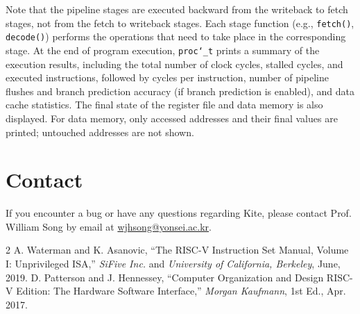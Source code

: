 \documentclass[10pt]{article}
\begin{document}
\begin{itemize}
    Note that the pipeline stages are executed backward from the writeback to fetch stages, not from the fetch to writeback stages.
    Each stage function (e.g., {\tt\small fetch()}, {\tt\small decode()}) performs the operations that need to take place in the corresponding stage.
    At the end of program execution, {\tt\small proc\char`_t} prints a summary of the execution results, including the total number of clock cycles, stalled cycles, and executed instructions, followed by cycles per instruction, number of pipeline flushes and branch prediction accuracy (if branch prediction is enabled), and data cache statistics.
    The final state of the register file and data memory is also displayed.
    For data memory, only accessed addresses and their final values are printed; untouched addresses are not shown.
\end{itemize}


\section{Contact} \label{sec:contact}
If you encounter a bug or have any questions regarding Kite, please contact Prof. William Song by email at \href{mailto:wjhsong@yonsei.ac.kr}{wjhsong@yonsei.ac.kr}.


\begin{thebibliography}{2}
    A. Waterman and K. Asanovic, 
    ``The RISC-V Instruction Set Manual, Volume I: Unprivileged ISA,''
    \emph{SiFive Inc.} and \emph{University of California, Berkeley},
    June, 2019.
    D. Patterson and J. Hennessey,
    ``Computer Organization and Design RISC-V Edition: The Hardware Software Interface,''
    \emph{Morgan Kaufmann}, 1st Ed.,
    Apr. 2017.
\end{thebibliography}
\end{document}
